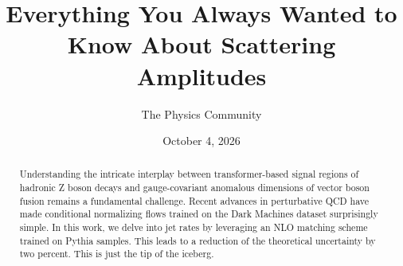 \documentclass[11pt]{article}
\title{Everything You Always Wanted to Know About Scattering Amplitudes}
\author{The Physics Community}
\date{October 4, 2026}
\numberwithin{equation}{section}
\theoremstyle{definition}
\theoremstyle{remark}
\begin{document}
\maketitle
\begin{abstract}
Understanding the intricate interplay between transformer-based signal
regions of hadronic Z boson decays and gauge-covariant anomalous
dimensions of vector boson fusion remains a fundamental challenge.
Recent advances in perturbative QCD have made conditional normalizing
flows trained on the Dark Machines dataset surprisingly simple. In this
work, we delve into jet rates by leveraging an NLO matching scheme
trained on Pythia samples. This leads to a reduction of the theoretical
uncertainty by two percent. This is just the tip of the iceberg.
\end{abstract}
\tableofcontents




\nocite{*}


\end{document}
